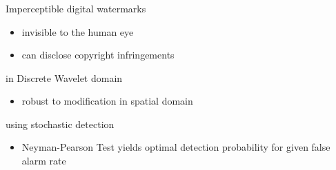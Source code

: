 \begin{frame}\frametitle{\insertsection}
\begin{block}{Imperceptible digital watermarks}
\begin{itemize}
\item invisible to the human eye
\item can disclose copyright infringements
\end{itemize}
\end{block}

\begin{block}{in Discrete Wavelet domain}
\begin{itemize}
\item robust to modification in spatial domain
\end{itemize}
\end{block}

\begin{block}{using stochastic detection}
\begin{itemize}
\item Neyman-Pearson Test yields optimal detection probability for given false alarm rate
\end{itemize}
\end{block}

\end{frame}